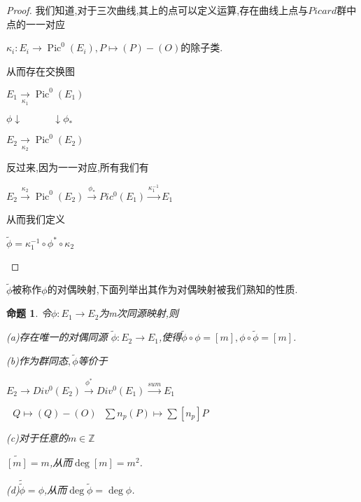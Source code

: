\documentclass[11pt]{ctexart}
\DeclareMathOperator{\Deg}{deg}
\DeclareMathOperator{\Pic}{Pic}
\newtheorem{pro}{命题}[section]
\begin{document}
\begin{proof}
我们知道,对于三次曲线,其上的点可以定义运算,存在曲线上点与$Picard$群中点的一一对应
\begin{center}
    $\kappa_i :E_i \rightarrow \Pic^{0}(E_i)$$,P\mapsto (P)-(O)$的除子类.
\end{center}

\noindent 从而存在交换图
\begin{center}

    $E_1 \underset{\kappa_1}{\longrightarrow} \Pic^{0}(E_1)$

    $\phi\downarrow ~~~~~~~~~~~~~~\downarrow\phi_{*} $

    $E_2 \underset{\kappa_2}{\longrightarrow} \Pic^{0}(E_2)$

\end{center}

\noindent 反过来,因为一一对应,所有我们有
\begin{center}

    $E_2 \overset{\kappa_2}{\longrightarrow} \Pic^{0}(E_2)\overset{\phi_{*}}{\longrightarrow}Pic^{0}(E_1)\overset{\kappa_1^{-1}}{\longrightarrow} E_1$
\end{center}

\noindent 从而我们定义
\begin{center}
    $\widetilde{\phi}=\kappa_1^{-1}\circ\phi^{*} \circ\kappa_2 $
\end{center}
\end{proof}

\noindent $\widetilde{\phi}$被称作$\phi$的对偶映射,下面列举出其作为对偶映射被我们熟知的性质.

\begin{pro}令$\phi:E_1 \rightarrow E_2$为m次同源映射,则

    (a)存在唯一的对偶同源
    $\widetilde{\phi}:E_2 \rightarrow E_1$,使得$\widetilde{\phi}\circ \phi=[m]$$,\phi\circ \widetilde{\phi}=[m]$.

    (b)作为群同态$,\widetilde{\phi}$等价于
    \begin{center}
        $E_2 \longrightarrow Div^0(E_2) \overset{\phi^{*}}{\longrightarrow} Div^0(E_1)\overset{sum}{\longrightarrow}E_1$ 

        $~~~Q \longmapsto (Q)-(O)~~~ \sum n_p(P)\longmapsto \sum [n_p]P$
    \end{center}

    (c)对于任意的$m \in \mathbb{Z}$
    \begin{center}
        $\widetilde{[m]}=m$,从而$\Deg[m]=m^2$.

    \end{center}

    (d)$\widetilde{\widetilde{\phi}}=\phi$,从而$\Deg\widetilde{\phi}=\Deg\phi$.





\end{pro}
\end{document}
